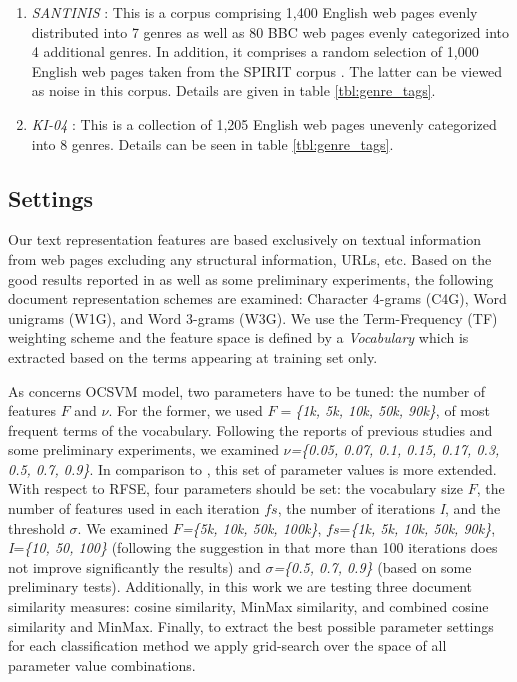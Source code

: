 \documentclass[runningheads]{llncs}
\begin{document}
\begin{enumerate}
\item \textit{SANTINIS} \citep{mehler2010genres_on_web}: This is a corpus comprising 1,400 English web pages evenly distributed into 7 genres as well as 80 BBC web pages evenly categorized into 4 additional genres. In addition, it comprises a random selection of 1,000 English web pages taken from the SPIRIT corpus \citep{joho2004spirit}. The latter can be viewed as noise in this corpus. Details are given in table \ref{tbl:genre_tags}.
\item \textit{KI-04} \citep{meyer2004genre}: This is a collection of 1,205 English web pages unevenly categorized into 8 genres. Details can be seen in table \ref{tbl:genre_tags}.
\end{enumerate}


\subsection{Settings}\label{sec:evaluation_measures}

Our text representation features are based exclusively on textual information from web pages excluding any structural information, URLs, etc. Based on the good results reported in \citep{sharoff2010web,pritsos2013open,Asheghi2015} as well as some preliminary experiments, the following document representation schemes are examined: Character 4-grams (C4G), Word unigrams (W1G), and Word 3-grams (W3G). We use the Term-Frequency (TF) weighting scheme  and the feature space is defined by a \textit{Vocabulary} which is extracted based on the terms appearing at training set only.

As concerns OCSVM model, two parameters have to be tuned: the number of features $F$ and $\nu$. For the former, we used $F=$\textit{\{1k, 5k, 10k, 50k, 90k\}}, of most frequent terms of the vocabulary. Following the reports of previous studies \citep{scholkopf1999estimating} and some preliminary experiments, we examined $\nu$\textit{=\{0.05, 0.07, 0.1, 0.15, 0.17, 0.3, 0.5, 0.7, 0.9\}}. In comparison to \citep{pritsos2013open}, this set of parameter values is more extended. With respect to RFSE, four parameters should be set: the vocabulary size $F$, the number of features used in each iteration $fs$, the number of iterations \textit{I}, and the threshold $\sigma$. We examined $F$\textit{=\{5k, 10k, 50k, 100k\}}, $fs$=\textit{\{1k, 5k, 10k, 50k, 90k\}}, \textit{I}=\textit{\{10, 50, 100\}} (following the suggestion in \citep{koppel2011authorship} that more than 100 iterations does not improve significantly the results) and $\sigma$\textit{=\{0.5, 0.7, 0.9\}} (based on some preliminary tests). Additionally, in this work we are testing three document similarity measures: cosine similarity, MinMax similarity,  and combined cosine similarity and MinMax. Finally, to extract the best possible parameter settings for each classification method we apply grid-search over the space of all parameter value combinations.
\end{document}
